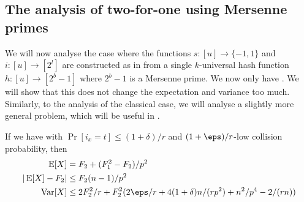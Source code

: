 \subsection{The analysis of two-for-one using Mersenne primes}
We will now analyse the case where the functions $s : [u] \to \{-1, 1\}$
and $i : [u] \to [2^l]$ are constructed as in  from a
single $k$-universal hash function $h : [u] \to [2^b - 1]$ where $2^b - 1$
is a Mersenne prime.
We now only have .
We will show that this does
not change the expectation and variance too much. Similarly, to the
analysis of the classical case, we will analyse a slightly more general
problem, which will be useful in .
\begin{lemma}\label{lem:count-mersenne}
   If we have  with $
    \Pr[i_x = t] \le (1 + \delta)/r$
   and $(1+\eps)/r$-low collision probability,
   then
    \begin{align}
        \E[X] &= F_2 + (F_1^2 - F_2)/p^2 \\
        | \E[X] - F_2 | &\le F_2 (n - 1)/p^2 \\
        \Var[X] &\le 2F_2^2/r + F_2^2 (2\eps/r + 4(1 + \delta)n / (rp^2) + n^2/p^4 - 2 /(rn))
    \end{align}
\end{lemma}
